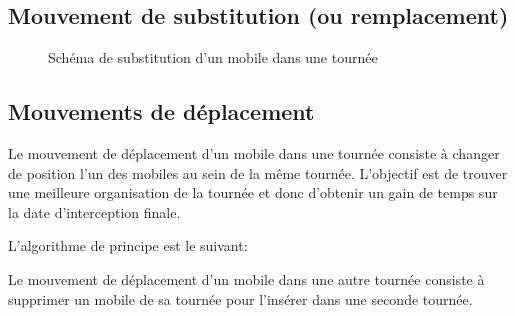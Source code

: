 		\subsection{Mouvement de substitution (ou remplacement)}
			\begin{figure}[h!]
			\centering
			\begin{tikzpicture}[schema]
				
			\end{tikzpicture}
			\caption{Schéma de substitution d'un mobile dans une tournée}
			\label{fig:move_replace}
			\end{figure}

		\subsection{Mouvements de déplacement}
			Le mouvement de déplacement d'un mobile dans une tournée consiste à changer de position l'un des mobiles au sein de la même tournée. L'objectif est de trouver une meilleure organisation de la tournée et donc d'obtenir un gain de temps sur la date d'interception finale.

			L'algorithme de principe est le suivant:
			\begin{code}
				\begin{algo}[informal]
					\BEGIN
									\ENDIF
								\ENDFORGEN
							\ENDFORGEN
						\ENDFORGEN
					\END
				\end{algo}
			\end{code}


			Le mouvement de déplacement d'un mobile dans une autre tournée consiste à supprimer un mobile de sa tournée pour l'insérer dans une seconde tournée.



